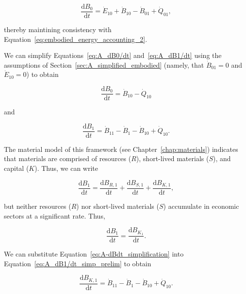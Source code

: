 \begin{equation} \label{eq:A_dB0/dt_waste_outflow}
	\frac{\mathrm{d}B_{0}}{\mathrm{d}t} 
	= \dot{E}_{10}
	+ \dot{B}_{10} 
	- \dot{B}_{01}
	+ \dot{Q}_{01},
\end{equation}

\noindent thereby maintining consistency with
Equation~\ref{eq:embodied_energy_accounting_2}.

We can simplify 
Equations~\ref{eq:A_dB0/dt} and~\ref{eq:A_dB1/dt} 
using the assumptions of Section~\ref{sec:A_simplified_embodied} 
(namely, that $\dot{B}_{01} = 0$ and $\dot{E}_{10} = 0$)
to obtain

\begin{equation} \label{eq:A_dB0/dt_simp}
	\frac{\mathrm{d}B_{0}}{\mathrm{d}t} 
	= \dot{B}_{10} 
	- \dot{Q}_{10}
\end{equation}

\noindent and

\begin{equation} \label{eq:A_dB1/dt_simp_prelim}
	\frac{\mathrm{d}B_{1}}{\mathrm{d}t} 
	= \dot{B}_{11}
	- \dot{B}_{1}
	- \dot{B}_{10}
	+ \dot{Q}_{10}.
\end{equation}

\noindent{}The material model of this framework (see Chapter~\ref{chap:materials})
indicates that materials are comprised of 
resources ($R$), 
short-lived materials ($S$), and
capital ($K$).
Thus, we can write 

\begin{equation}
	\frac{\mathrm{d}B_{1}}{\mathrm{d}t} 
	= \frac{\mathrm{d}B_{R,1}}{\mathrm{d}t} 
	+ \frac{\mathrm{d}B_{S,1}}{\mathrm{d}t} 
	+ \frac{\mathrm{d}B_{K,1}}{\mathrm{d}t},
\end{equation}

\noindent{}but neither resources ($R$) nor short-lived
materials ($S$) accumulate in economic sectors at a significant rate.
Thus, 

\begin{equation} \label{eq:A-dBdt_simplification}
	\frac{\mathrm{d}B_{1}}{\mathrm{d}t} 
	= \frac{\mathrm{d}B_{K_{1}}}{\mathrm{d}t}.
\end{equation}

\noindent{}We can substitute Equation~\ref{eq:A-dBdt_simplification}
into Equation~\ref{eq:A_dB1/dt_simp_prelim} to obtain

\begin{equation} \label{eq:A_dB1/dt_simp}
	\frac{\mathrm{d}B_{K,1}}{\mathrm{d}t}
	= \dot{B}_{11}
	- \dot{B}_{1}
	- \dot{B}_{10}
	+ \dot{Q}_{10}.
\end{equation}

